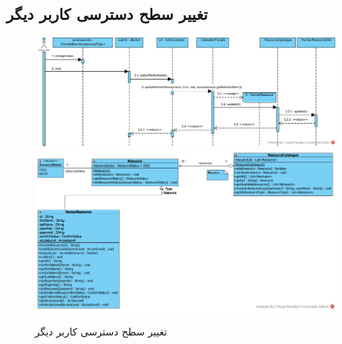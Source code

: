 \begin{landscape}
\section{تغییر سطح دسترسی کاربر دیگر}
\begin{figure}[H]
	\centering
	\includegraphics[scale=0.6]{img/sequence-design/ChangeAccessLevel}
	\includegraphics[scale=0.6]{img/sequence-design/ChangeAccessLevelC}
	\caption{تغییر سطح دسترسی کاربر دیگر}
\end{figure}

\newpage

\end{landscape}
